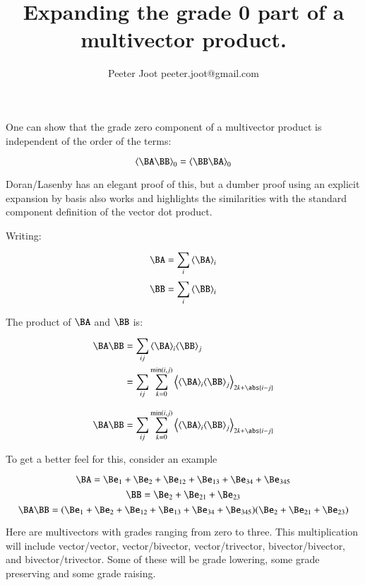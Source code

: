 \documentclass{article}      %
\title{ Expanding the grade 0 part of a multivector product. } %
\author{Peeter Joot \quad peeter.joot@gmail.com}         %
\newcommand{\gpgrade}[2] {{\left\langle{{#1}}\right\rangle}_{#2}}
\newcommand{\gpgradezero}[1] {\gpgrade{#1}{0}}
\begin{document}

\maketitle{}


One can show that the grade zero component of a multivector product 
is independent of the order of the terms:

\begin{equation}
\gpgradezero{\BA \BB} = \gpgradezero{\BB \BA}
\end{equation}

Doran/Lasenby has an elegant proof of this, but a dumber proof using an
explicit expansion by basis also works and highlights the similarities
with the standard component definition of the vector dot product.

Writing:

\[
\BA = \sum_i \gpgrade{\BA}{i}
\]
\[
\BB = \sum_i \gpgrade{\BB}{i}
\]

The product of $\BA$ and $\BB$ is:

\begin{align*}
\BA \BB 
&= \sum_{ij} \gpgrade{\BA}{i} \gpgrade{\BB}{j} \\
&= \sum_{ij} \sum_{k=0}^{\min(i,j)}\gpgrade{\gpgrade{\BA}{i} \gpgrade{\BB}{j}}{2k + \abs{i-j}} \\
\end{align*}

\begin{equation}\label{eqn:product}
\BA \BB 
= \sum_{ij} \sum_{k=0}^{\min(i,j)}\gpgrade{\gpgrade{\BA}{i} \gpgrade{\BB}{j}}{2k + \abs{i-j}} 
\end{equation}

To get a better feel for this, consider an example

\[
\BA = \Be_1 + \Be_2 + \Be_{12} + \Be_{13} + \Be_{34} + \Be_{345}
\]
\[
\BB = \Be_2 + \Be_{21} + \Be_{23}
\]
\[
\BA \BB = ( \Be_1 + \Be_2 + \Be_{12} + \Be_{13} + \Be_{34} + \Be_{345})(\Be_2 + \Be_{21} + \Be_{23})
\]

Here are multivectors with grades ranging from zero to three.  This multiplication will include vector/vector, vector/bivector, vector/trivector, bivector/bivector, and bivector/trivector.  Some of these will be grade lowering, some grade preserving and some grade raising.
\end{document}
